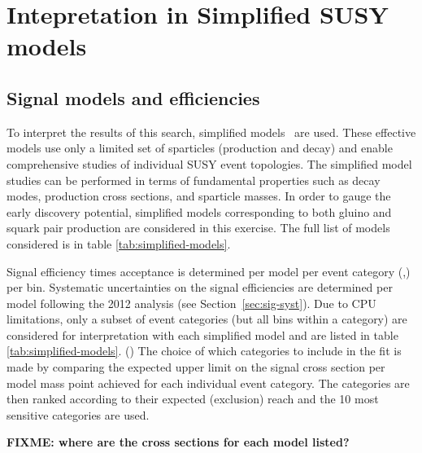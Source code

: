 \section{Intepretation in Simplified SUSY models}
\label{sec:susy}

\subsection{Signal models and efficiencies}
\label{subsec:susy_models}
To interpret the results of this search, simplified
models~\cite{Alwall:2008ag,Alwall:2008va,sms} are used. These
effective models use only a limited set of sparticles (production and
decay) and enable comprehensive studies of individual SUSY event
topologies. The simplified model studies can be performed in terms of
fundamental properties such as decay modes, production cross sections,
and sparticle masses. 
In order to gauge the early discovery potential, simplified models corresponding to both gluino and squark pair production 
are considered in this exercise. The full list of models considered is in table \ref{tab:simplified-models}. 

Signal efficiency times acceptance is determined per model per event
category (\njet,\nb) per \scalht bin. Systematic
uncertainties on the signal efficiencies are determined per model
following the 2012 analysis (see Section~\ref{sec:sig-syst}). Due to CPU
limitations, only a subset of event categories (but all \scalht bins
within a category) are considered for interpretation with each
simplified model and are listed in table \ref{tab:simplified-models}. ()
The choice of which categories to include in the fit 
is made by comparing the expected upper limit on the signal cross section 
per model mass point achieved for each individual event category. 
The categories are then ranked according to their expected (exclusion) reach 
and the 10 most sensitive categories are used. 

\textbf{FIXME: where are the cross sections for each model listed?}

